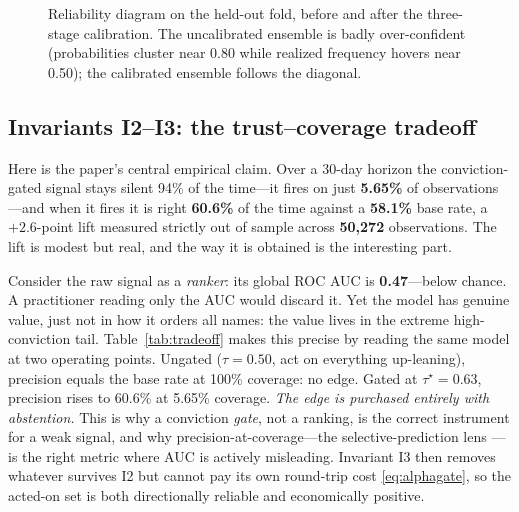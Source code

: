 \documentclass[conference]{IEEEtran}
\begin{document}
\begin{figure}[t]
\centering
{}
\caption{Reliability diagram on the held-out fold, before and after the three-stage
calibration. The uncalibrated ensemble is badly over-confident (probabilities
cluster near 0.80 while realized frequency hovers near 0.50); the calibrated
ensemble follows the diagonal.}
\label{fig:calib}
\end{figure}

\subsection{Invariants I2--I3: the trust--coverage tradeoff}
\label{sec:tradeoff}
Here is the paper's central empirical claim. Over a 30-day horizon the
conviction-gated signal stays silent 94\% of the time---it fires on just
\textbf{5.65\%} of observations---and when it fires it is right \textbf{60.6\%} of
the time against a \textbf{58.1\%} base rate, a $+2.6$-point lift measured strictly
out of sample across \textbf{50{,}272} observations. The lift is modest but real,
and the way it is obtained is the interesting part.

Consider the raw signal as a \emph{ranker}: its global ROC AUC is
\textbf{0.47}---below chance. A practitioner reading only the AUC would discard it.
Yet the model has genuine value, just not in how it orders all names: the value
lives in the extreme high-conviction tail. Table~\ref{tab:tradeoff} makes this
precise by reading the same model at two operating points. Ungated ($\tau=0.50$,
act on everything up-leaning), precision equals the base rate at 100\% coverage:
no edge. Gated at $\tau^\star=0.63$, precision rises to 60.6\% at 5.65\% coverage.
\emph{The edge is purchased entirely with abstention.} This is why a conviction
\emph{gate}, not a ranking, is the correct instrument for a weak signal, and why
precision-at-coverage---the selective-prediction lens
\cite{chow1970,geifman2017}---is the right metric where AUC is actively
misleading. Invariant I3 then removes whatever survives I2 but cannot pay its own
round-trip cost \eqref{eq:alphagate}, so the acted-on set is both directionally
reliable and economically positive.
\end{document}

